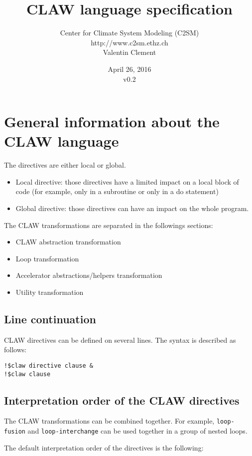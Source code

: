 \documentclass{article}
\title{CLAW language specification}
\author{Center for Climate System Modeling (C2SM)\\http://www.c2sm.ethz.ch\\Valentin Clement}
\date{April 26, 2016\\\vspace{1em}v0.2}
\begin{document}
\maketitle


\tableofcontents

\section{General information about the CLAW language}
The directives are either local or global.

\begin{itemize}
\item Local directive: those directives have a limited impact on a local block of
code (for example, only in a subroutine or only in a do statement)
\item Global directive: those directives can have an impact on the whole
program.
\end{itemize}

The CLAW transformations are separated in the followings sections:
\begin{itemize}
\item CLAW abstraction transformation
\item Loop transformation
\item Accelerator abstractions/helpers transformation
\item Utility transformation
\end{itemize}

\subsection{Line continuation}
CLAW directives can be defined on several lines. The syntax is described as follows:

\begin{lstlisting}
!$claw directive clause &
!$claw clause
\end{lstlisting}


\subsection{Interpretation order of the CLAW directives}
The CLAW transformations can be combined together. For example, \lstinline!loop-fusion! and \lstinline!loop-interchange! can be used together in a group of nested loops.

The default interpretation order of the directives is the following:
\end{document}
